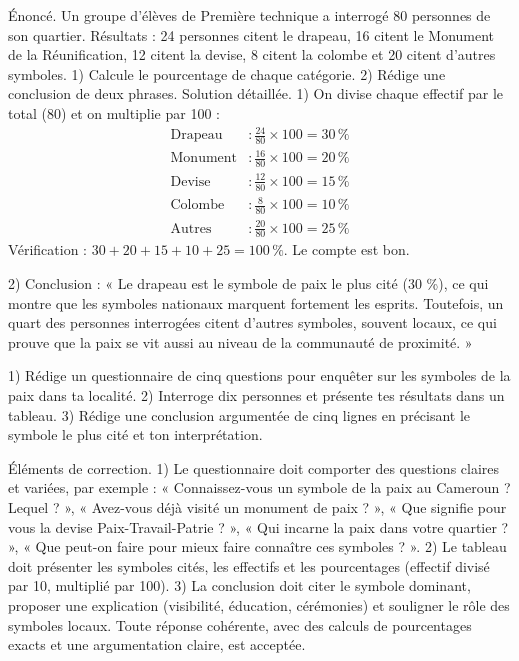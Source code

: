 \documentclass[11pt]{article}
\begin{document}
\begin{exoresolu}
Énoncé. Un groupe d'élèves de Première technique a interrogé 80 personnes de son quartier. Résultats : 24 personnes citent le drapeau, 16 citent le Monument de la Réunification, 12 citent la devise, 8 citent la colombe et 20 citent d'autres symboles. 1) Calcule le pourcentage de chaque catégorie. 2) Rédige une conclusion de deux phrases.
\tcblower
Solution détaillée.
1) On divise chaque effectif par le total (80) et on multiplie par 100 :
\begin{align*}
\text{Drapeau} &: \frac{24}{80}\times 100 = 30\,\% \\
\text{Monument} &: \frac{16}{80}\times 100 = 20\,\% \\
\text{Devise} &: \frac{12}{80}\times 100 = 15\,\% \\
\text{Colombe} &: \frac{8}{80}\times 100 = 10\,\% \\
\text{Autres} &: \frac{20}{80}\times 100 = 25\,\%
\end{align*}
Vérification : $30 + 20 + 15 + 10 + 25 = 100\,\%$. Le compte est bon.

2) Conclusion : « Le drapeau est le symbole de paix le plus cité (30 \%), ce qui montre que les symboles nationaux marquent fortement les esprits. Toutefois, un quart des personnes interrogées citent d'autres symboles, souvent locaux, ce qui prouve que la paix se vit aussi au niveau de la communauté de proximité. »
\end{exoresolu}

\begin{exercice}
1) Rédige un questionnaire de cinq questions pour enquêter sur les symboles de la paix dans ta localité. 2) Interroge dix personnes et présente tes résultats dans un tableau. 3) Rédige une conclusion argumentée de cinq lignes en précisant le symbole le plus cité et ton interprétation.
\end{exercice}

\begin{corrige}
Éléments de correction. 1) Le questionnaire doit comporter des questions claires et variées, par exemple : « Connaissez-vous un symbole de la paix au Cameroun ? Lequel ? », « Avez-vous déjà visité un monument de paix ? », « Que signifie pour vous la devise Paix-Travail-Patrie ? », « Qui incarne la paix dans votre quartier ? », « Que peut-on faire pour mieux faire connaître ces symboles ? ». 2) Le tableau doit présenter les symboles cités, les effectifs et les pourcentages (effectif divisé par 10, multiplié par 100). 3) La conclusion doit citer le symbole dominant, proposer une explication (visibilité, éducation, cérémonies) et souligner le rôle des symboles locaux. Toute réponse cohérente, avec des calculs de pourcentages exacts et une argumentation claire, est acceptée.
\end{corrige}
\end{document}
